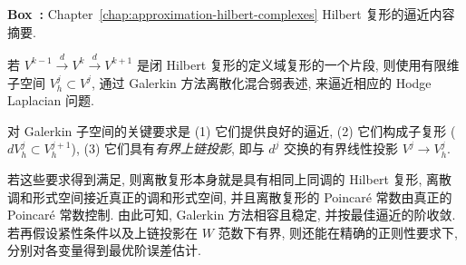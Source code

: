 \begin{MBSourceBox}
\label{box:approximation-hilbert-summary}
\noindent\textbf{Box~\thebooksummary:} {Chapter~\ref{chap:approximation-hilbert-complexes} Hilbert 复形的逼近内容摘要.}\par

{若 $V^{k-1}\xrightarrow{d}V^k\xrightarrow{d}V^{k+1}$ 是闭 Hilbert 复形的定义域复形的一个片段, 则使用有限维子空间 $V_h^j\subset V^j$, 通过 Galerkin 方法离散化混合弱表述, 来逼近相应的 Hodge Laplacian 问题.}

{对 Galerkin 子空间的关键要求是 (1) 它们提供良好的逼近, (2) 它们构成子复形 ($dV_h^j\subset V_h^{j+1}$), (3) 它们具有\emph{有界上链投影}, 即与 $d^j$ 交换的有界线性投影 $V^j\to V_h^j$.}

{若这些要求得到满足, 则离散复形本身就是具有相同上同调的 Hilbert 复形, 离散调和形式空间接近真正的调和形式空间, 并且离散复形的 Poincaré 常数由真正的 Poincaré 常数控制. 由此可知, Galerkin 方法相容且稳定, 并按最佳逼近的阶收敛. 若再假设紧性条件以及上链投影在 $W$ 范数下有界, 则还能在精确的正则性要求下, 分别对各变量得到最优阶误差估计.}
\end{MBSourceBox}

